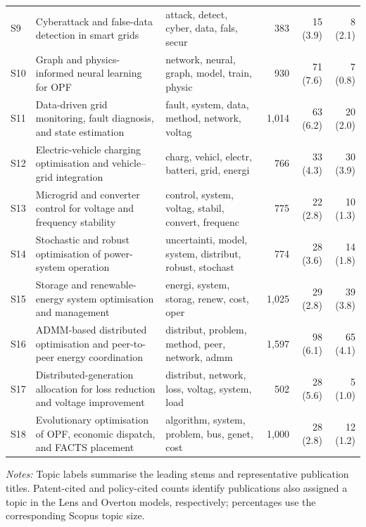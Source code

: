 \documentclass[a4paper,fleqn]{cas-sc}
\begin{document}
\begin{table}[htbp]
{\begin{tabular}{lp{43mm}p{38mm}rrr}
    S9 & Cyberattack and false-data detection in smart grids
    & attack, detect, cyber, data, fals, secur
    & 383 & 15 (3.9) & 8 (2.1) \\
    
    S10 & Graph and physics-informed neural learning for OPF
    & network, neural, graph, model, train, physic
    & 930 & 71 (7.6) & 7 (0.8) \\
    
    S11 & Data-driven grid monitoring, fault diagnosis, and state estimation
    & fault, system, data, method, network, voltag
    & 1,014 & 63 (6.2) & 20 (2.0) \\
    
    S12 & Electric-vehicle charging optimisation and vehicle--grid integration
    & charg, vehicl, electr, batteri, grid, energi
    & 766 & 33 (4.3) & 30 (3.9) \\
    
    S13 & Microgrid and converter control for voltage and frequency stability
    & control, system, voltag, stabil, convert, frequenc
    & 775 & 22 (2.8) & 10 (1.3) \\
    
    S14 & Stochastic and robust optimisation of power-system operation
    & uncertainti, model, system, distribut, robust, stochast
    & 774 & 28 (3.6) & 14 (1.8) \\
    
    S15 & Storage and renewable-energy system optimisation and management
    & energi, system, storag, renew, cost, oper
    & 1,025 & 29 (2.8) & 39 (3.8) \\
    
    S16 & ADMM-based distributed optimisation and peer-to-peer energy coordination
    & distribut, problem, method, peer, network, admm
    & 1,597 & 98 (6.1) & 65 (4.1) \\
    
    S17 & Distributed-generation allocation for loss reduction and voltage improvement
    & distribut, network, loss, voltag, system, load
    & 502 & 28 (5.6) & 5 (1.0) \\
    
    S18 & Evolutionary optimisation of OPF, economic dispatch, and FACTS placement
    & algorithm, system, problem, bus, genet, cost
    & 1,000 & 28 (2.8) & 12 (1.2) \\
    
    \bottomrule
    \end{tabular}%
    }
    \vspace{2mm}
    \begin{minipage}{\textwidth}
    \footnotesize
    \textit{Notes:} Topic labels summarise the leading stems and representative publication titles. Patent-cited and policy-cited counts identify publications also assigned a topic in the Lens and Overton models, respectively; percentages use the corresponding Scopus topic size.
    \end{minipage}
    \end{table}
    
\end{document}
